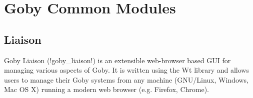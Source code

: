 \chapter{Goby Common Modules}\label{chap:common}
\MakeShortVerb{\!} %

\section{Liaison}

Goby Liaison (!goby_liaison!) is an extensible web-browser based GUI for managing various aspects of Goby. It is written using the Wt \cite{wt} library and allows users to manage their Goby systems from any machine (GNU/Linux, Windows, Mac OS X) running a modern web browser (e.g. Firefox, Chrome).
